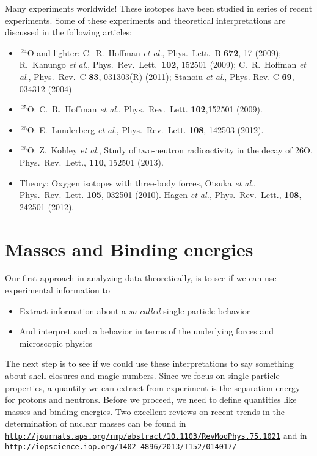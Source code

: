 \documentclass[graybox,sectrefs,envcountresetchap,open=right]{svmonodo}
\begin{document}
\noindent
 Many experiments worldwide!
These isotopes have been studied in series of recent experiments. Some of these experiments and theoretical interpretations are discussed in the following articles:

\begin{itemize}
\item $\,{}^{24}\mbox{O}$ and lighter:  C.~R.~Hoffman \emph{et al.}, Phys.~Lett.~B \textbf{672}, 17 (2009); R.~Kanungo \emph{et al}., Phys.~Rev.~Lett.~\textbf{102}, 152501 (2009); C.~R.~Hoffman \emph{et al}., Phys.~Rev.~C \textbf{83}, 031303(R) (2011); Stanoiu \emph{et al}., Phys. Rev. C \textbf{69}, 034312 (2004)

\item $\,{}^{25}\mbox{O}$: C.~R.~Hoffman \emph{et al}., Phys.~Rev.~Lett. \textbf{102},152501  (2009). 

\item $\,{}^{26}\mbox{O}$: E.~Lunderberg \emph{et al}., Phys.~Rev.~Lett. \textbf{108}, 142503 (2012). 

\item $\,{}^{26}\mbox{O}$: Z.~Kohley  \emph{et al}., Study of two-neutron radioactivity in the decay of 26O, Phys.~Rev.~Lett., \textbf{110}, 152501 (2013). 

\item Theory: Oxygen isotopes with three-body forces,  Otsuka \emph{et al}., Phys.~Rev.~Lett. \textbf{105}, 032501  (2010).  Hagen \emph{et al.}, Phys.~Rev.~Lett., \textbf{108}, 242501 (2012). 
\end{itemize}

\noindent
\section{Masses and Binding energies}
Our first approach in analyzing data theoretically, is to see if we can use experimental information to 

\begin{itemize}
\item Extract information about a \emph{so-called} single-particle  behavior

\item And interpret such a behavior in terms of the underlying forces and microscopic physics
\end{itemize}

\noindent
The next step is to see if we could use these interpretations to say something about shell closures and magic numbers. Since we focus on single-particle properties, a quantity we can extract from experiment is the separation energy for protons and neutrons. Before we proceed, we need to define quantities like masses and binding energies.   Two excellent reviews on 
recent trends in the determination of nuclear masses can be found in \href{{http://journals.aps.org/rmp/abstract/10.1103/RevModPhys.75.1021}}{\nolinkurl{http://journals.aps.org/rmp/abstract/10.1103/RevModPhys.75.1021}} and in \href{{http://iopscience.iop.org/1402-4896/2013/T152/014017/}}{\nolinkurl{http://iopscience.iop.org/1402-4896/2013/T152/014017/}}
\end{document}
